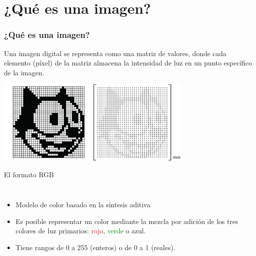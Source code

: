\section{¿Qué es una imagen?}

\begin{frame}
    \frametitle{¿Qué es una imagen?}
    \begin{block}{}
        Una imagen digital se representa como una matriz de valores, donde cada elemento (píxel) de la matriz almacena la intensidad de luz en un punto específico de la imagen.
    \end{block}

\begin{center}
    \includegraphics[width=9.5cm]{Figuras/Img01}
\end{center}


\end{frame}

\begin{frame}{El formato RGB}
    \begin{columns}
    \begin{itemize}
        \item 
        Modelo de color basado en la síntesis aditiva
        \item 
        Es posible representar un color mediante la mezcla por adición de los tres colores de luz primarios: \textcolor{red}{rojo}, \textcolor{green}{verde} o \textcolor{azul}{azul}.
        \item 
        Tiene rangos de 0 a 255 (enteros) o de 0 a 1 (reales).
    \end{itemize}
    \end{columns}
\end{frame}

